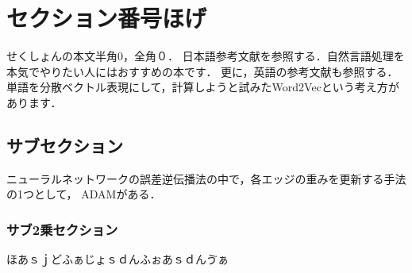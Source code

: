 \documentclass[10pt, a4j, uplatex, twocolumn]{jsarticle}
\begin{document}


\section{セクション番号ほげ}
せくしょんの本文半角0，全角０．
日本語参考文献を参照する．自然言語処理を本気でやりたい人にはおすすめの本\cite{Natural_Language_Processing_by_Deep_Learning}です．
更に，英語の参考文献も参照する．単語を分散ベクトル表現にして，計算しようと試みたWord2Vecという考え方\cite{Mikolov_word2vec}があります．
\subsection{サブセクション}
ニューラルネットワークの誤差逆伝播法の中で，各エッジの重みを更新する手法の1つとして，
ADAM\cite{ADAM}がある．

\subsubsection{サブ2乗セクション}
ほあｓｊどふぁじょｓｄんふぉあｓｄんゔぁ




\end{document}
